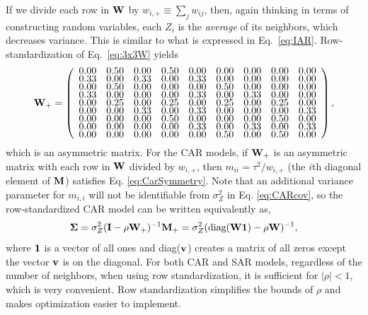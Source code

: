 \documentclass[11pt, titlepage]{article}\usepackage[]{graphicx}\usepackage[]{color}
\begin{document}
\begin{spacing}{1.9}
\begin{flushleft}
If we divide each row in $\mathbf{W}$ by $w_{i,+} \equiv \sum_j w_{ij}$, then, again thinking in terms of constructing random variables, each $Z_i$ is the \textit{average} of its neighbors, which decreases variance. This is similar to what is expressed in Eq.~\ref{eq:IAR}. Row-standardization of Eq.~\ref{eq:3x3W} yields
\begin{equation} \label{eq:W9plus}
\renewcommand\arraystretch{.5}
\bW_+ = \left(
\begin{array}{ccccccccc}
 0.00 & 0.50 & 0.00 & 0.50 & 0.00 & 0.00 & 0.00 & 0.00 & 0.00 \\ 
  0.33 & 0.00 & 0.33 & 0.00 & 0.33 & 0.00 & 0.00 & 0.00 & 0.00 \\ 
  0.00 & 0.50 & 0.00 & 0.00 & 0.00 & 0.50 & 0.00 & 0.00 & 0.00 \\ 
  0.33 & 0.00 & 0.00 & 0.00 & 0.33 & 0.00 & 0.33 & 0.00 & 0.00 \\ 
  0.00 & 0.25 & 0.00 & 0.25 & 0.00 & 0.25 & 0.00 & 0.25 & 0.00 \\ 
  0.00 & 0.00 & 0.33 & 0.00 & 0.33 & 0.00 & 0.00 & 0.00 & 0.33 \\ 
  0.00 & 0.00 & 0.00 & 0.50 & 0.00 & 0.00 & 0.00 & 0.50 & 0.00 \\ 
  0.00 & 0.00 & 0.00 & 0.00 & 0.33 & 0.00 & 0.33 & 0.00 & 0.33 \\ 
  0.00 & 0.00 & 0.00 & 0.00 & 0.00 & 0.50 & 0.00 & 0.50 & 0.00 \\ 
  
\end{array}
\right),
\end{equation}
which is an asymmetric matrix. For the CAR models, if $\mathbf{W}_+$ is an asymmetric matrix with each row in $\mathbf{W}$ divided by $w_{i,+}$, then $m_{ii} = \tau^2/w_{i,+}$ (the $i$th diagonal element of $\mathbf{M}$) satisfies Eq. \ref{eq:CarSymmetry}. Note that an additional variance parameter for $m_{i,i}$ will not be identifiable from $\sigma_Z^2$ in Eq. \ref{eq:CARcov}, so the row-standardized CAR model can be written equivalently as,
\begin{equation}\label{eq:bWone}
  \mbox{\boldmath $\Sigma$} = \sigma_Z^2(\mathbf{I} - \rho\mathbf{W}_+)^{-1}\mathbf{M}_+= \sigma_Z^2(\textrm{diag}(\mathbf{W}\mathbf{1}) - \rho\mathbf{W})^{-1},
\end{equation}
where $\mathbf{1}$ is a vector of all ones and diag($\mathbf{v}$) creates a matrix of all zeros except the vector $\mathbf{v}$ is on the diagonal. For both CAR and SAR models, regardless of the number of neighbors, when using row standardization, it is sufficient for $|\rho| < 1$, which is very convenient. Row standardization simplifies the bounds of $\rho$ and makes optimization easier to implement.  


\end{flushleft}
\end{spacing}
\end{document}
